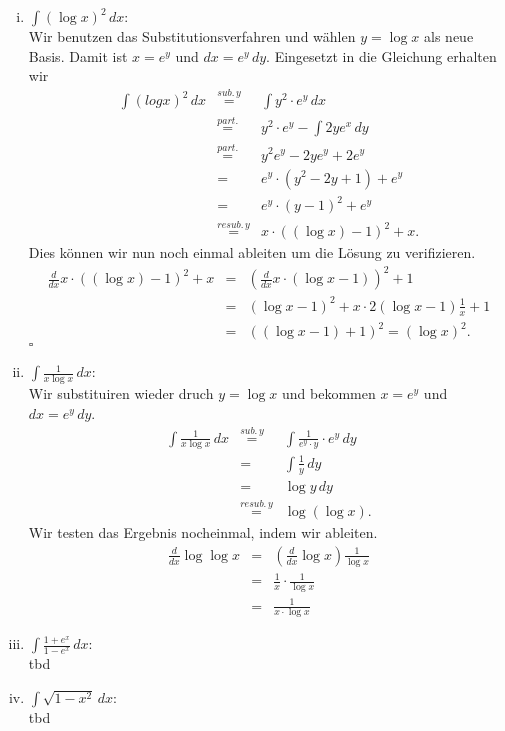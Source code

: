 \documentclass[11pt,a4paper,ngerman]{article}
\begin{document}
\begin{enumerate}[(i)]
	\item $\int (\log x)^2 \, dx$:\\
		Wir benutzen das Substitutionsverfahren und wählen $y = \log x$ als neue Basis. Damit ist $x = e^y$ und $dx = e^y \, dy$. 
		Eingesetzt in die Gleichung erhalten wir
		$$\begin{array}{rcl}
			\int (log x)^2 \, dx 	&\stackrel{sub. \, y}{=}& \int y^2 \cdot e^y \, dx\\
						&\stackrel{part.}{=}&  y^2\cdot e^y - \int 2ye^x \, dy\\
						&\stackrel{part.}{=}& y^2e^y  - 2ye^y + 2e^y\\
						&=& e^y \cdot (y^2 - 2y + 1) + e^y\\
						&=& e^y \cdot (y-1)^2 + e^y\\
						&\stackrel{resub. \, y}{=}& x \cdot ((\log x) - 1)^2 + x.
		\end{array}$$
		Dies können wir nun noch einmal ableiten um die Lösung zu verifizieren.
		$$\begin{array}{rcl}
			\frac{d}{dx} x \cdot ((\log x) - 1)^2 +x
							&=& (\frac{d}{dx} x \cdot (\log x - 1))^2 + 1\\
							&=& (\log x - 1)^2 + x \cdot 2 (\log x - 1) \frac {1}{x} + 1\\
							&=& ((\log x - 1) + 1)^2 = (\log x)^2.
		\end{array}$$
		\mbox{}\hfill $\square$

	\item $\int \frac{1}{x \log x} \, dx$:\\
		Wir substituiren wieder druch $y=\log x$ und bekommen $x=e^y$ und $dx = e^y \, dy$.
		$$\begin{array}{rcl}
			\int \frac{1}{x \log x} \, dx 
					&\stackrel{sub. \, y}{=}&	\int \frac{1}{e^y \cdot y} \cdot e^y \, dy\\
					&=& \int \frac{1}{y} \, dy\\
					&=& \log y \, dy\\
					&\stackrel{resub. \, y}{=}& \log (\log x).
		\end{array}$$
		Wir testen das Ergebnis nocheinmal, indem wir ableiten.
		$$\begin{array}{rcl}
			\frac{d}{dx} \log \log x &=& (\frac{d}{dx} \log x) \frac{1}{\log x}\\
				&=& \frac{1}{x} \cdot \frac{1}{\log x}\\
				&=& \frac{1}{x \cdot \log x}
		\end{array}$$

	\item $\int \frac{1+e^x}{1-e^x} \, dx$:\\

		tbd

	\item $\int \sqrt{1-x^2} \, dx$:\\

		tbd
\end{enumerate}
\end{document}
